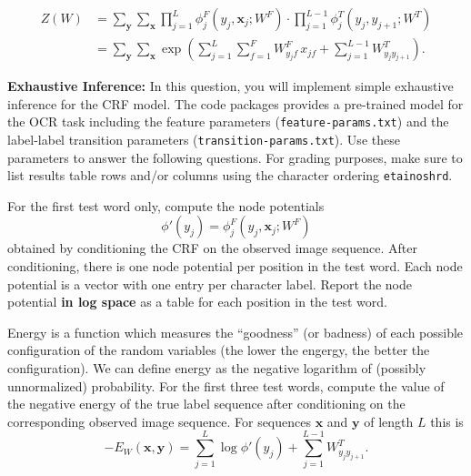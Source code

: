 \documentclass[11pt]{article}
\newcommand{\mbf}[1]{{\mathbf{#1}}} \newcommand{\eq}{\!=\!}
\begin{document}
\begin{align*}
Z(W)
&=\displaystyle
         \sum_{\mbf{y}}\sum_{\mbf{x}}\prod_{j=1}^{L}\phi^F_j(y_{j},\mbf{x}_{j};W^F) \cdot \prod_{j=1}^{L-1}\phi^T_j(y_{j},y_{j+1};W^T)\\
&= \displaystyle
     \sum_{\mbf{y}}\sum_{\mbf{x}}\exp\left(\sum_{j=1}^{L}\sum_{f=1}^F
     W^F_{y_{j} f} \, x_{jf}
     +\sum_{j=1}^{L-1} W^T_{y_{j} y_{j+1}}\right).
\end{align*}

\begin{problem}{20} \textbf{Exhaustive Inference:} In this question, you will
  implement simple exhaustive inference for the CRF model. The code packages
  provides a pre-trained model for the OCR task including the feature
  parameters (\texttt{feature-params.txt}) and the label-label transition
  parameters (\texttt{transition-params.txt}). Use these parameters to answer
  the following questions. For grading purposes, make sure to list results
  table rows and/or columns using the character ordering \texttt{etainoshrd}.

 {For the first test word only, compute the node potentials
\[ \phi'(y_{j})=\phi^F_j(y_{j},\mbf{x}_{j};W^F) \]
obtained by conditioning the CRF on the observed image sequence. After conditioning, there is one node potential per position in the test word. Each node potential is a vector with one entry per character label. Report the node potential \textbf{in log space} as a table for each position in the test word.} 

 {Energy is a function which measures the ``goodness'' (or badness) of each possible configuration of the random variables (the lower the engergy, the better the configuration). 
We can define energy as the negative logarithm of (possibly unnormalized) probability. For the first three test words, compute the value of the negative
  energy of the true label sequence after conditioning on the corresponding
  observed image sequence. For sequences $\mbf{x}$ and $\mbf{y}$ of length $L$ this is
  $$-E_W(\mbf{x},\mbf{y})=\sum_{j=1}^{L} \log \phi'(y_{j}) + \sum_{j=1}^{L-1} W^T_{y_{j} y_{j+1}}.$$}




\end{problem}
\end{document}

